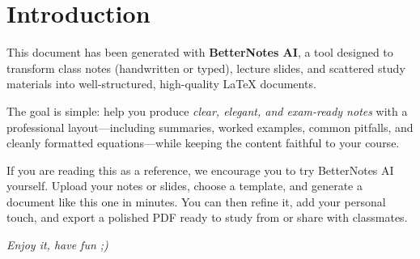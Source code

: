 
\chapter*{Introduction}

This document has been generated with \textbf{BetterNotes AI}, a tool designed to transform
class notes (handwritten or typed), lecture slides, and scattered study materials into
well-structured, high-quality \LaTeX{} documents.

The goal is simple: help you produce \emph{clear, elegant, and exam-ready notes} with a
professional layout---including summaries, worked examples, common pitfalls, and
cleanly formatted equations---while keeping the content faithful to your course.

If you are reading this as a reference, we encourage you to try BetterNotes AI yourself.
Upload your notes or slides, choose a template, and generate a document like this one in minutes.
You can then refine it, add your personal touch, and export a polished PDF ready to study from
or share with classmates. 

\medskip
\noindent \textit{Enjoy it, have fun ;)}
